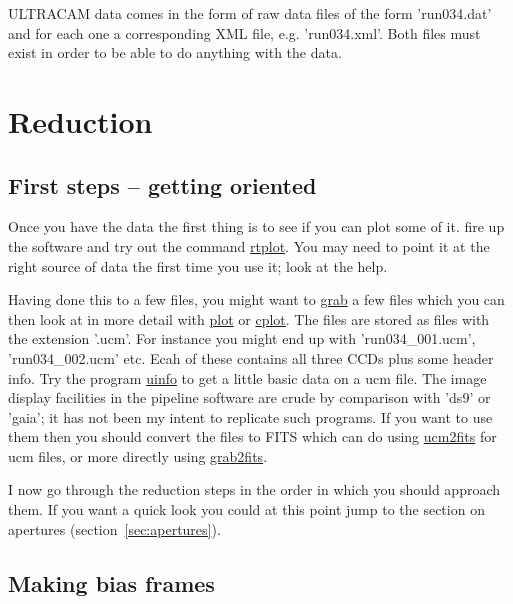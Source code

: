 \documentclass[10pt,a4paper,twocolumn]{article}
\newcommand{\main}{http://quetzel.csc.warwick.ac.uk/phsaap/software}
\newcommand{\ultracam}{\main/ultracam/html}
\begin{document}
ULTRACAM data comes in the form of raw data files of the form 'run034.dat' and
for each one a corresponding XML file, e.g. 'run034.xml'. Both files must exist
in order to be able to do anything with the data.

\section{Reduction}

\subsection{First steps -- getting oriented}

Once you have the data the first thing is to see if you can plot some of it. 
fire up the software and try out the command
\href{\ultracam/rtplot.html}{rtplot}. You may need to point it at the right
source of data the first time you use it; look at the help.

Having done this to a few files, you might want to
\href{\ultracam/grab.html}{grab} a few files which you can then look at in more
detail with \href{\ultracam/plot.html}{plot} or
\href{\ultracam/cplot.html}{cplot}. The files are stored as files
with the extension '.ucm'. For instance you might end up with 'run034\_001.ucm',
'run034\_002.ucm' etc. Ecah of these contains all three CCDs plus some header
info. Try the program \href{\ultracam/uinfo.html}{uinfo} to get a little basic
data on a ucm file. The image display facilities in the pipeline software are
crude by comparison with 'ds9' or 'gaia'; it has not been my intent to replicate
such programs. If you want to use them then you should convert the files to
FITS which can do using \href{\ultracam/ucm2fits.html}{ucm2fits} for ucm files,
or more directly using \href{\ultracam/grab2fits.html}{grab2fits}. 

I now go through the reduction steps in the order in which you should approach
them. If you want a quick look you could at this point jump to the section
on apertures (section~\ref{sec:apertures}).

\subsection{Making bias frames}
\end{document}
